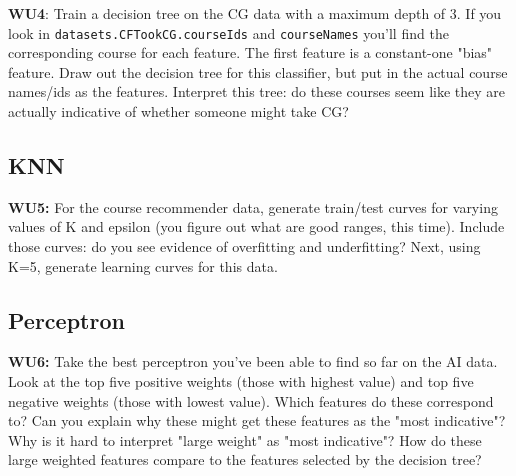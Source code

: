 \documentclass[a4paper,11pt]{article}
\begin{document}
\noindent
\textbf{WU4}: \textsf{Train a decision tree on the CG data with a maximum depth
of 3.  If you look in \texttt{datasets.CFTookCG.courseIds}
and \texttt{courseNames} you'll find the corresponding course for
each feature.  The first feature is a constant-one "bias" feature.
Draw out the decision tree for this classifier, but put in the actual
course names/ids as the features.  Interpret this tree: do these
courses seem like they are actually indicative of whether someone
might take CG?}

\subsection{KNN}
\textbf{WU5:} \textsf{For the course recommender data, generate train/test
curves for varying values of K and epsilon (you figure out what are
good ranges, this time).  Include those curves: do you see evidence of
overfitting and underfitting?  Next, using K=5, generate learning
curves for this data.}


\subsection{Perceptron}
\textbf{WU6:} \textsf{Take the best perceptron you've been able to find
  so far on the AI data.  Look at the top five positive weights (those
  with highest value) and top five negative weights (those with lowest
  value).  Which features do these correspond to?  Can you explain why
  these might get these features as the "most indicative"?  Why is it
  hard to interpret "large weight" as "most indicative"?  How do these
  large weighted features compare to the features selected by the
  decision tree?}
\end{document}
